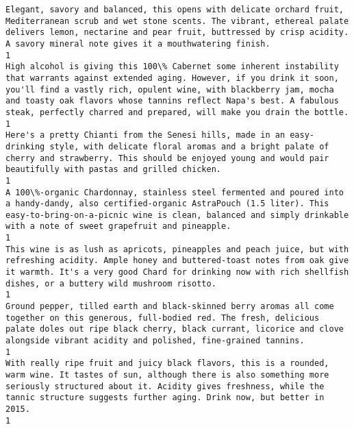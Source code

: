 \documentclass[11pt]{article}
\begin{document}
\begin{Verbatim}[commandchars=\\\{\}]
Elegant, savory and balanced, this opens with delicate orchard fruit, Mediterranean scrub and wet stone scents. The vibrant, ethereal palate delivers lemon, nectarine and pear fruit, buttressed by crisp acidity. A savory mineral note gives it a mouthwatering finish.                                                                                                                                     1
High alcohol is giving this 100\% Cabernet some inherent instability that warrants against extended aging. However, if you drink it soon, you'll find a vastly rich, opulent wine, with blackberry jam, mocha and toasty oak flavors whose tannins reflect Napa's best. A fabulous steak, perfectly charred and prepared, will make you drain the bottle.                                                       1
Here's a pretty Chianti from the Senesi hills, made in an easy-drinking style, with delicate floral aromas and a bright palate of cherry and strawberry. This should be enjoyed young and would pair beautifully with pastas and grilled chicken.                                                                                                                                                              1
A 100\%-organic Chardonnay, stainless steel fermented and poured into a handy-dandy, also certified-organic AstraPouch (1.5 liter). This easy-to-bring-on-a-picnic wine is clean, balanced and simply drinkable with a note of sweet grapefruit and pineapple.                                                                                                                                                  1
This wine is as lush as apricots, pineapples and peach juice, but with refreshing acidity. Ample honey and buttered-toast notes from oak give it warmth. It's a very good Chard for drinking now with rich shellfish dishes, or a buttery wild mushroom risotto.                                                                                                                                               1
Ground pepper, tilled earth and black-skinned berry aromas all come together on this generous, full-bodied red. The fresh, delicious palate doles out ripe black cherry, black currant, licorice and clove alongside vibrant acidity and polished, fine-grained tannins.                                                                                                                                       1
With really ripe fruit and juicy black flavors, this is a rounded, warm wine. It tastes of sun, although there is also something more seriously structured about it. Acidity gives freshness, while the tannic structure suggests further aging. Drink now, but better in 2015.                                                                                                                                1

\end{Verbatim}
\end{document}
